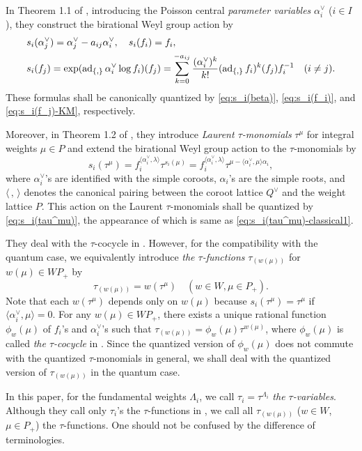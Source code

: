 \documentclass[12pt,twoside]{article}
\newcommand\bra{\langle}
\newcommand\ket{\rangle}
\newcommand\ad{\mathop{\mathrm{ad}}\nolimits}
\newcommand\av{\alpha^\vee}
\newcommand\Qv{Q^\vee}
\theoremstyle{plain} %
\theoremstyle{definition} %
\theoremstyle{definition} %
\numberwithin{theorem}{section}
\numberwithin{equation}{section}
\numberwithin{figure}{section}
\numberwithin{table}{section}
\begin{document}
In Theorem 1.1 of \cite{NY0012028}, 
introducing the Poisson central {\em parameter variables} $\av_i$ ($i\in I$), 
they construct the birational Weyl group action by
\begin{align}
 &
 s_i(\av_j) = \av_j-a_{ij}\av_i, \quad
 s_i(f_i)=f_i,
 \notag 
 \\ &
 s_i(f_j) 
 = \exp(\ad_{\{,\}}\av_i\log f_i)(f_j)
 = \sum_{k=0}^{-a_{ij}} \frac{(\av_i)^k}{k!}(\ad_{\{,\}} f_i)^k(f_j) f_i^{-1}
 \quad (i\ne j).
 \label{eq:s_i(f_j)-classical}
\end{align}
These formulas shall be canonically quantized by 
\eqref{eq:s_i(beta)}, 
\eqref{eq:s_i(f_i)}, and 
\eqref{eq:s_i(f_j)-KM}, respectively.

Moreover, in Theorem 1.2 of \cite{NY0012028}, 
they introduce {\em Laurent $\tau$-monomials} $\tau^\mu$ 
for integral weights $\mu\in P$ 
and extend the birational Weyl group action to the $\tau$-monomials by
\begin{equation}
 s_i(\tau^\mu) 
 = f_i^{\bra\av_i,\lambda\ket} \tau^{s_i(\mu)}
 = f_i^{\bra\av_i,\lambda\ket} \tau^{\mu-\bra\av_i,\mu\ket\alpha_i},
 \label{eq:s_i(tau^mu)-classical1}
\end{equation}
where $\av_i$'s are identified with the simple coroots, 
$\alpha_i$'s are the simple roots, 
and $\bra\,,\,\ket$ denotes the canonical pairing between the coroot lattice $\Qv$
and the weight lattice $P$.
This action on the Laurent $\tau$-monomials shall
be quantized by \eqref{eq:s_i(tau^mu)}, the appearance of which is same as
\eqref{eq:s_i(tau^mu)-classical1}.

They deal with the $\tau$-cocycle in \cite{NY0012028}.
However, for the compatibility with the quantum case, 
we equivalently introduce {\em the $\tau$-functions} $\tau_{(w(\mu))}$ 
for $w(\mu)\in WP_+$ by
\begin{equation*}
 \tau_{(w(\mu))} = w(\tau^\mu) \quad (w\in W, \mu\in P_+).
\end{equation*}
Note that each $w(\tau^\mu)$ depends only on $w(\mu)$ 
because $s_i(\tau^\mu)=\tau^\mu$ if $\bra\av_i,\mu\ket=0$.
For any $w(\mu)\in WP_+$, there exists a unique rational function $\phi_w(\mu)$
of $f_i$'s and $\av_i$'s such that $\tau_{(w(\mu))}=\phi_w(\mu)\tau^{w(\mu)}$, 
where $\phi_w(\mu)$ is called {\em the $\tau$-cocycle} in \cite{NY0012028}.
Since the quantized version of $\phi_w(\mu)$ does not commute 
with the quantized $\tau$-monomials in general, 
we shall deal with the quantized version of $\tau_{(w(\mu))}$ in the quantum case.

In this paper, for the fundamental weights $\Lambda_i$, 
we call $\tau_i=\tau^{\Lambda_i}$ {\em the $\tau$-variables}.
Although they call only $\tau_i$'s the $\tau$-functions in \cite{NY0012028},
we call all $\tau_{(w(\mu))}$ ($w\in W$, $\mu\in P_+$) the $\tau$-functions. 
One should not be confused by the difference of terminologies.
\end{document}
